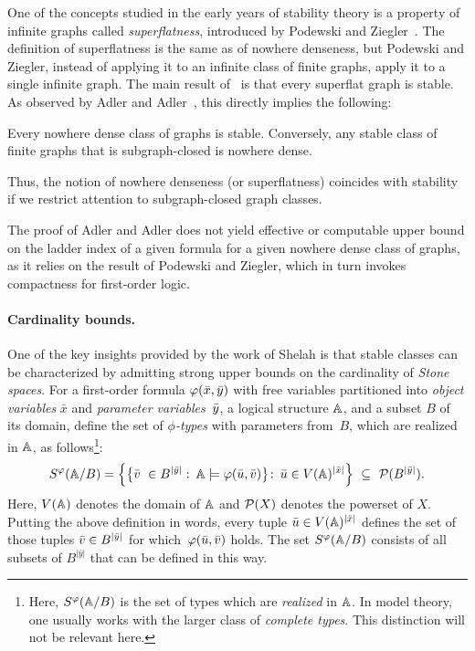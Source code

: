 One of the concepts studied in the early years of stability theory is
a property of infinite graphs called \emph{superflatness}, introduced
by Podewski and Ziegler~\cite{podewski1978stable}.  The definition of
superflatness is the same as of nowhere denseness, but Podewski and
Ziegler, instead of applying it to an infinite class of finite graphs,
apply it to a single infinite graph.  The main result
of~\cite{podewski1978stable} is that every superflat graph is stable.
As observed by Adler and Adler~\cite{adler2014interpreting}, this
directly implies the following:
 \begin{theorem}\label{thm:adleradler}
   Every nowhere dense class of graphs is stable. Conversely, any
   stable class of finite graphs that is subgraph-closed is nowhere
   dense.
 \end{theorem}
 Thus, the notion of nowhere denseness (or superflatness) coincides
 with stability if we restrict attention to subgraph-closed graph
 classes.
 
 The proof of Adler and Adler does not yield effective or computable
 upper bound on the ladder index of a given formula for a given
 nowhere dense class of graphs, as it relies on the result of Podewski
 and Ziegler, which in turn invokes compactness for first-order logic.

\paragraph{Cardinality bounds.}
One of the key insights provided by the work of Shelah is that stable
classes can be characterized by admitting strong upper bounds on the
cardinality of \emph{Stone spaces}.  For a first-order formula
$\varphi(\bar{x},\bar{y})$ with free variables partitioned into
\emph{object variables} $\bar x$ and \emph{parameter
  variables}~$\bar{y}$, a logical structure $\mathbb A$, and a subset $B$
of its domain, define the set of \emph{$\phi$-types} with parameters
from~$B$, which are realized in $\mathbb{A}$, as follows\footnote{Here,
  $S^\varphi(\mathbb A/B)$ is the set of types which are \emph{realized} in
  $\mathbb A$. In model theory, one usually works with the larger class
  of \emph{complete types}. This distinction will not be relevant
  here.}:
\begin{equation}\label{eq:stone-def}
  S^\varphi (\mathbb{A}/B)  = 
  \left\{\big\{\bar{v}\ \in B^{|\bar y|}\, \colon\, 
    \mathbb{A}\models\varphi(\bar{u},\bar{v})\big\} \colon\, 
    \bar{u}\in V(\mathbb{A})^{|\bar x|}\right\}\  \subseteq\  \mathcal{P}(B^{|\bar y|}).
\end{equation}
Here, $V(\mathbb{A})$ denotes the domain of $\mathbb{A}$ and $\mathcal{P}(X)$ denotes
the powerset of $X$.  Putting the above definition in words, every
tuple $\bar{u}\in V(\mathbb{A})^{|\bar x|}$ defines the set of those tuples
$\bar{v}\in B^{|\bar y|}$ for which~$\varphi(\bar{u},\bar{v})$ holds.  The
set $S^\varphi(\mathbb{A}/B)$ consists of all subsets of $B^{|\bar y|}$ that
can be defined in this way.


